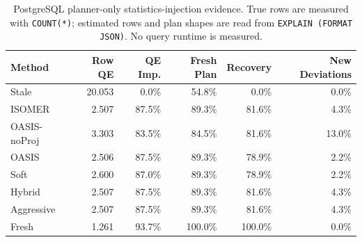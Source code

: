 \begin{table}[t]
  \centering
  \small
  \caption{PostgreSQL planner-only statistics-injection evidence. True rows are measured with \texttt{COUNT(*)}; estimated rows and plan shapes are read from \texttt{EXPLAIN (FORMAT JSON)}. No query runtime is measured.}
  \label{tab:postgres_planner_stats_injection}
  \setlength{\tabcolsep}{4pt}
  \begin{tabular}{lrrrrr}
    \toprule
    Method & Row QE & QE Imp. & Fresh Plan & Recovery & New Deviations \\
    \midrule
    Stale & 20.053 & 0.0\% & 54.8\% & 0.0\% & 0.0\% \\
    ISOMER & 2.507 & 87.5\% & 89.3\% & 81.6\% & 4.3\% \\
    OASIS-noProj & 3.303 & 83.5\% & 84.5\% & 81.6\% & 13.0\% \\
    OASIS & 2.506 & 87.5\% & 89.3\% & 78.9\% & 2.2\% \\
    Soft & 2.600 & 87.0\% & 89.3\% & 78.9\% & 2.2\% \\
    Hybrid & 2.507 & 87.5\% & 89.3\% & 81.6\% & 4.3\% \\
    Aggressive & 2.507 & 87.5\% & 89.3\% & 81.6\% & 4.3\% \\
    Fresh & 1.261 & 93.7\% & 100.0\% & 100.0\% & 0.0\% \\
    \bottomrule
  \end{tabular}
\end{table}
